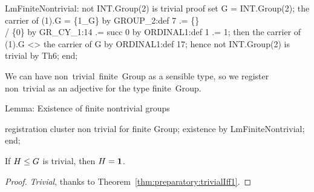 \nwenddocs{}\endmoddef\nwstartdeflinemarkup{}\nwenddeflinemarkup
LmFiniteNontrivial:
  not INT.Group(2) is trivial
proof
  set G = INT.Group(2);
  the carrier of (1).G = \{1_G\} by GROUP_2:def 7
                      .= \{\} \\/ \{0\} by GR_CY_1:14
                      .= succ 0 by ORDINAL1:def 1
                      .= 1;
  then the carrier of (1).G <> the carrier of G by ORDINAL1:def 17;
  hence not INT.Group(2) is trivial by Th6;
end;
\eatline
{}\nwendcode{}\nwdocspar
\begin{registration}
We can have {\Tt{}non\ trivial\ finite\ Group\nwendquote} as a sensible type, so we
register {\Tt{}non\ trivial\nwendquote} as an adjective for the type {\Tt{}finite\ Group\nwendquote}.
\end{registration}

\nwenddocs{}\endmoddef\nwstartdeflinemarkup{}\nwenddeflinemarkup
\LA{}Lemma: Existence of finite nontrivial groups~{\nwtagstyle{}}\RA{}

registration
  cluster non trivial for finite Group;
  existence by LmFiniteNontrivial;
end;

\nwendcode{}\nwdocspar

\begin{theorem}\label{thm:characteristic:preparatory:trivial-subgroups-look-like-1}
If $H\leq G$ is trivial, then $H=\mathbf{1}$.
\end{theorem}

\begin{proof}
\emph{Trivial}, thanks to Theorem~\ref{thm:preparatory:trivialIff1}.
\end{proof}

